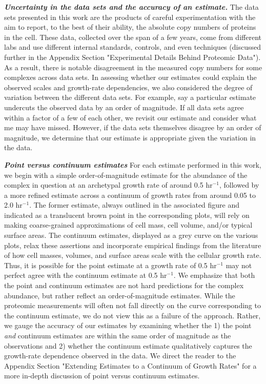 \begin{featurebox}
\textbf{\itshape Uncertainty in the data sets and the accuracy of an estimate.}
The data sets presented in this work are the products of careful experimentation
with the aim to report, to the best of their ability, the absolute copy numbers
of proteins in the cell. These data, collected over the span of a few years,
come from different labs and use different internal standards, controls, and
even techniques (discussed further in the Appendix Section "Experimental Details
Behind Proteomic Data"). As a result, there is notable disagreement in the
measured copy numbers for some complexes across data sets. In assessing whether
our estimates could explain the observed scales and growth-rate dependencies, we
also considered the degree of variation between the different data sets. For
example, say a particular estimate undercuts the observed data by an order of
magnitude. If all data sets agree within a factor of a few of each other, we
revisit our estimate and consider what me may have missed. However, if the data
sets themselves disagree by an order of magnitude, we determine that our
estimate is appropriate given the variation in the data.
\label{box:estimate_rules}

\textbf{\itshape  Point versus continuum estimates}
For each estimate performed in this work, we begin with a simple
order-of-magnitude estimate for the abundance of the complex in question at
an archetypal growth rate of around 0.5 hr$^{-1}$, followed by a more refined
estimate across a continuum of growth rates from around 0.05 to 2.0
hr$^{-1}$. The former estimate, always outlined in the associated figure and
indicated as a translucent brown point in the corresponding plots, will rely
on making coarse-grained approximations of cell mass, cell volume, and/or
typical surface areas. The continuum estimates, displayed as a grey curve on
the various plots, relax these assertions and incorporate empirical findings
from the literature of how cell masses, volumes, and surface areas scale with
the cellular growth rate. Thus, it is possible for the point estimate at a
growth rate of 0.5 hr$^{-1}$ may not perfect agree with the continuum
estimate at 0.5 hr$^{-1}$. We emphasize that both the point and continuum
estimates are not hard predictions for the complex abundance, but rather
reflect an order-of-magnitude estimates. While the proteomic measurements
will often not fall directly on the curve corresponding to the continuum
estimate, we do not view this as a failure of the approach. Rather, we gauge
the accuracy of our estimates by examining whether the 1) the point
\textit{and} continuum estimates are within the same order of magnitude as
the observations and 2) whether the continuum estimate qualitatively captures
the growth-rate dependence observed in the data. We direct the reader to the
Appendix Section "Extending Estimates to a Continuum of Growth Rates" for a more in-depth discussion of point versus continuum estimates.

\end{featurebox}


